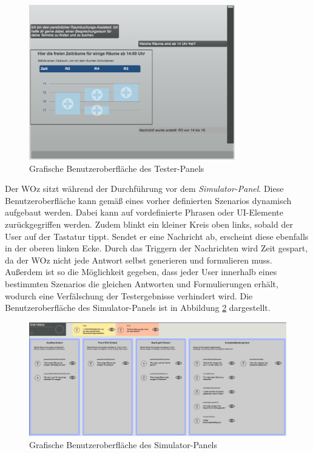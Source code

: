 \begin{figure}[H]
    \centering
    \includegraphics[width=0.8\textwidth]{bilder/TesterPanel.png}
    \caption{Grafische Benutzeroberfläche des Tester-Panels}
    \label{fig:tester-panel}
\end{figure}

Der \ac{WOz} sitzt während der Durchführung vor dem \textit{Simulator-Panel}. Diese Benutzeroberfläche kann gemäß eines vorher definierten Szenarios dynamisch aufgebaut werden. Dabei kann auf vordefinierte Phrasen oder \ac{UI}-Elemente zurückgegriffen werden. Zudem blinkt ein kleiner Kreis oben links, sobald der User auf der Tastatur tippt. Sendet er eine Nachricht ab, erscheint diese ebenfalls in der oberen linken Ecke. Durch das Triggern der Nachrichten wird Zeit gespart, da der \ac{WOz} nicht jede Antwort selbst generieren und formulieren muss. Außerdem ist so die Möglichkeit gegeben, dass jeder User innerhalb eines bestimmten Szenarios die gleichen Antworten und Formulierungen erhält, wodurch eine Verfälschung der Testergebnisse verhindert wird. Die Benutzeroberfläche des Simulator-Panels ist in Abbildung \ref{fig:simulator-panel} dargestellt.
\newline

\begin{figure}[H]
    \centering
    \includegraphics[width=1.0\textwidth]{bilder/simulator-panel.png}
    \caption{Grafische Benutzeroberfläche des Simulator-Panels}
    \label{fig:simulator-panel}
\end{figure}


